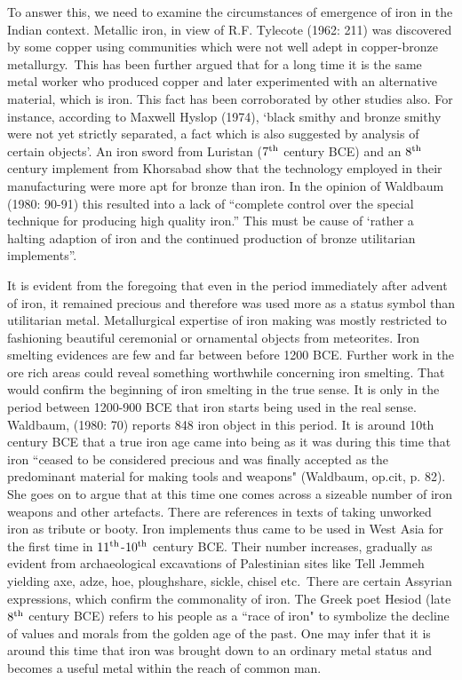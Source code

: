 {To answer this, we need to examine the circumstances of emergence of iron in the Indian context. Metallic iron, in view of R.F. Tylecote (1962: 211) was discovered by some copper using communities which were not well adept in copper-bronze metallurgy.~This has been further argued that for a long time it is the same metal worker who produced copper and later experimented with an alternative material, which is iron. This fact has been corroborated by other studies also. For instance, according to Maxwell Hyslop (1974), ‘black smithy and bronze smithy were not yet strictly separated, a fact which is also suggested by analysis of certain objects’. An iron sword from Luristan ($7^{\rm th}$ century BCE) and an $8^{\rm th}$ century implement from Khorsabad show that the technology employed in their manufacturing were more apt for bronze than iron. In the opinion of Waldbaum (1980: 90-91) this resulted into a lack of “complete control over the special technique for producing high quality iron.” This must be cause of ‘rather a halting adaption of iron and the continued production of bronze utilitarian implements”.

It is evident from the foregoing that even in the period immediately after advent of iron, it remained precious and therefore was used more as a status symbol than utilitarian metal. Metallurgical expertise of iron making was mostly restricted to fashioning beautiful ceremonial or ornamental objects from meteorites. Iron smelting evidences are few and far between before 1200 BCE. Further work in the ore rich areas could reveal something worthwhile concerning iron smelting. That would confirm the beginning of iron smelting in the true sense. It is only in the period between 1200-900 BCE that iron starts being used in the real sense. Waldbaum, (1980: 70) reports 848 iron object in this period. It is around 10th century BCE that a true iron age came into being as it was during this time that iron ``ceased to be considered precious and was finally accepted as the predominant material for making tools and weapons" (Waldbaum, op.cit, p. 82). She goes on to argue that at this time one comes across a sizeable number of iron weapons and other artefacts. There are references in texts of taking unworked iron as tribute or booty. Iron implements thus came to be used in West Asia for the first time in $11^{\rm th}$-$10^{\rm th}$ century BCE. Their number increases, gradually as evident from archaeological excavations of Palestinian sites like Tell Jemmeh yielding axe, adze, hoe, ploughshare, sickle, chisel etc.~There are certain Assyrian expressions, which confirm the commonality of iron. The Greek poet Hesiod (late $8^{\rm th}$ century BCE) refers to his people as a ``race of iron" to symbolize the decline of values and morals from the golden age of the past. One may infer that it is around this time that iron was brought down to an ordinary metal status and becomes a useful metal within the reach of common man. 

}
